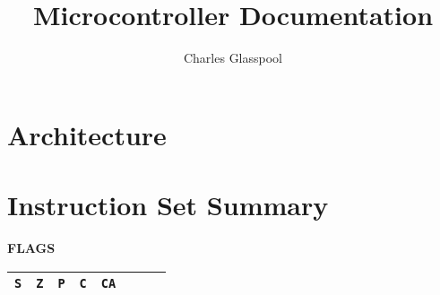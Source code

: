 \documentclass[10pt]{article}
\begin{document}
\title{Microcontroller Documentation}
\author{Charles Glasspool}

\maketitle

\section{Architecture}

\section{Instruction Set Summary}

\textbf{FLAGS}
\begin{center}
\begin{tabular}{|c|c|c|c|c|c|c|c|}
\hline
\verb|S| & \verb|Z| & \verb|P| & \verb|C| & \verb|CA| & & & \\
\hline
\end{tabular}
\end{center}
\end{document}
